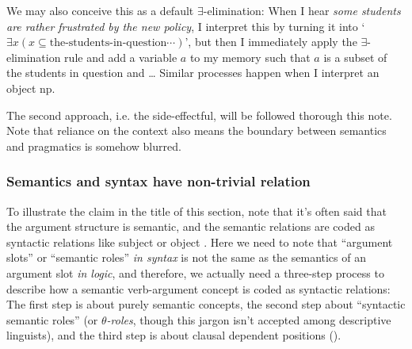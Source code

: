 \documentclass[UTF8, a4paper, oneside, scheme=plain]{ctexrep}
\newcommand*{\citepage}[1]{pp.~{#1}}
\newcommand*{\term}[1]{\emph{#1}}
\newcommand{\corpus}[1]{\emph{#1}}
\newcommand{\translate}[1]{`#1'}
\begin{document}
We may also conceive this as a default $\exists$-elimination:
When I hear \corpus{some students are rather frustrated by the new policy},
I interpret this by turning it into 
\translate{$\exists x (x \subseteq \text{the-students-in-question} \cdots)$},
but then I immediately apply the $\exists$-elimination rule 
and add a variable $a$ to my memory such that 
$a$ is a subset of the students in question and \dots
Similar processes happen when I interpret an object \acs{np}.

The second approach, i.e. the side-effectful,
will be followed thorough this note.
Note that reliance on the context also means the boundary between semantics and pragmatics 
is somehow blurred.

\subsubsection{Semantics and syntax have non-trivial relation}\label{sec:semantics-argument}

To illustrate the claim in the title of this section, note that
it's often said that the argument structure is semantic, 
and the semantic relations are coded as syntactic relations like subject or object
\citep[\citepage{111}]{dixon2005semantic}.
Here we need to note that ``argument slots'' or ``semantic roles'' \emph{in syntax}
is not the same as the semantics of an argument slot \emph{in logic},
and therefore,
we actually need a three-step process to describe how a semantic verb-argument concept 
is coded as syntactic relations:
The first step is about purely semantic concepts,
the second step about ``syntactic semantic roles''
(or \term{$\theta$-roles}, though this jargon isn't accepted among descriptive linguists),
and the third step is about clausal dependent positions 
().
\end{document}
